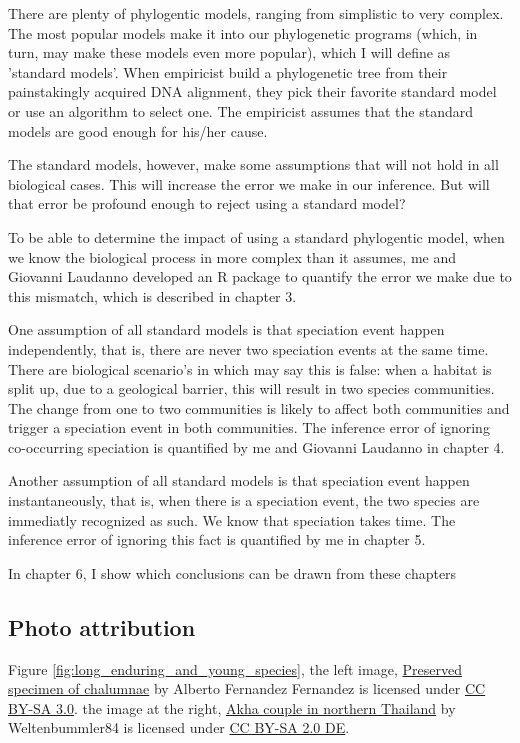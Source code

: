 There are plenty of phylogentic models, ranging from simplistic to
very complex. The most popular models make it into our
phylogenetic programs (which, in turn, may make these models even
more popular), which I will define as 'standard models'.
When empiricist build a phylogenetic tree from their
painstakingly acquired DNA alignment, they pick their favorite standard
model or use an algorithm to select one. The empiricist assumes that the
standard models are good enough for his/her cause.

The standard models, however, make some assumptions that will not hold
in all biological cases. This will increase the error we make in
our inference. But will that error be profound enough to reject using
a standard model? 

To be able to determine the impact of using a standard phylogentic
model, when we know the biological process in more complex than it
assumes, me and Giovanni Laudanno developed an R package 
to quantify the error we make due to this mismatch, which is described
in chapter 3.

One assumption of all standard models is that speciation event happen
independently, that is, there are never two speciation events at the same time. 
There are biological scenario's in which may say
this is false: when a habitat is split up, 
due to a geological barrier, this will result in two 
species communities. The change from one to two communities is likely
to affect both communities and trigger a speciation event in both
communities. The inference error of ignoring co-occurring speciation is quantified by
me and Giovanni Laudanno in chapter 4.

Another assumption of all standard models is that speciation event happen
instantaneously, that is, when there is a speciation event, the two species
are immediatly recognized as such. We know that speciation takes
time. 
The inference error of ignoring this fact is quantified by
me in chapter 5.

In chapter 6, I show which conclusions can be drawn from these chapters


\subsection{Photo attribution}

Figure \ref{fig:long_enduring_and_young_species},
the left image,
\href{https://en.wikipedia.org/wiki/File:Latimeria_Chalumnae_-_Coelacanth_-_NHMW.jpg}{Preserved specimen of chalumnae}
by Alberto Fernandez Fernandez
is licensed under \href{https://creativecommons.org/licenses/by-sa/3.0/deed.en}{CC BY-SA 3.0}.
the image at the right,
\href{https://commons.wikimedia.org/wiki/File:Akha_cropped_hires.JPG}{Akha couple in northern Thailand}
by Weltenbummler84
is licensed under \href{https://creativecommons.org/licenses/by-sa/2.0/de/deed.en}{CC BY-SA 2.0 DE}.

